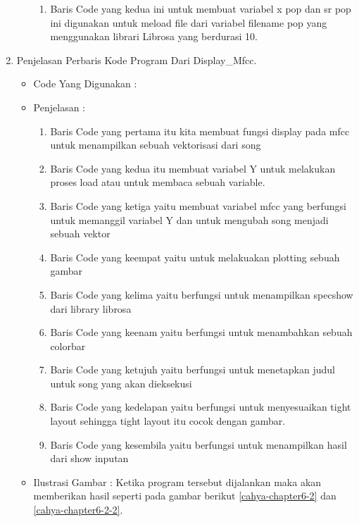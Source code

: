 \begin{enumerate}
\begin{itemize}
\begin{enumerate}
\item Baris Code yang kedua ini untuk membuat variabel x pop dan sr pop ini digunakan untuk meload file dari variabel filename pop yang menggunakan librari Librosa yang berdurasi 10.
\end{enumerate}
\end{itemize}
\par
\item Penjelasan Perbaris Kode Program Dari Display\_Mfcc.
\begin{itemize}
\item Code Yang Digunakan :
\par

\par
\par
\item Penjelasan :
\par
\begin{enumerate}
\item Baris Code yang pertama itu kita membuat fungsi display pada mfcc untuk menampilkan sebuah vektorisasi dari song
\item Baris Code yang kedua itu membuat variabel Y untuk melakukan proses load atau untuk membaca sebuah variable. 
\item Baris Code yang ketiga yaitu membuat variabel mfcc yang berfungsi untuk memanggil variabel Y dan untuk mengubah song menjadi sebuah vektor
\item Baris Code yang keempat yaitu untuk melakuakan plotting sebuah gambar
\item Baris Code yang kelima yaitu berfungsi untuk menampilkan specshow dari library librosa
\item Baris Code yang keenam yaitu berfungsi untuk menambahkan sebuah colorbar
\item Baris Code yang ketujuh yaitu berfungsi untuk menetapkan judul untuk song yang akan dieksekusi
\item Baris Code yang kedelapan yaitu berfungsi untuk menyesuaikan tight layout sehingga tight layout itu cocok dengan gambar.
\item Baris Code yang kesembila yaitu berfungsi untuk menampilkan hasil dari show inputan
\end{enumerate}
\par
\item Ilustrasi Gambar : Ketika program tersebut dijalankan maka akan memberikan hasil seperti pada gambar berikut \ref {cahya-chapter6-2} dan \ref{cahya-chapter6-2-2}.
\par

\end{itemize}
\end{enumerate}
